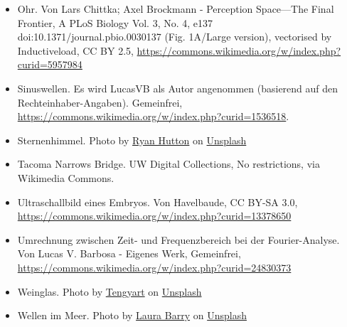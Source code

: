 \documentclass{beamer}
\begin{document}
\begin{frame}
\begin{tiny}
\begin{itemize}
\item
Ohr. Von Lars Chittka; Axel Brockmann - Perception Space—The Final Frontier, A PLoS Biology Vol. 3, No. 4, e137 doi:10.1371/journal.pbio.0030137 (Fig. 1A/Large version), vectorised by Inductiveload, CC BY 2.5, \url{https://commons.wikimedia.org/w/index.php?curid=5957984}

\item
Sinuswellen. Es wird LucasVB als Autor angenommen (basierend auf den Rechteinhaber-Angaben). Gemeinfrei, \url{https://commons.wikimedia.org/w/index.php?curid=1536518}.  

\item
Sternenhimmel. Photo by \href{https://unsplash.com/@ryan_hutton_?utm_source=unsplash&utm_medium=referral&utm_content=creditCopyText}{Ryan Hutton} on \href{https://unsplash.com/s/photos/stars?utm_source=unsplash&utm_medium=referral&utm_content=creditCopyText}{Unsplash}

\item
Tacoma Narrows Bridge. UW Digital Collections, No restrictions, via Wikimedia Commons.

\item
Ultraschallbild eines Embryos. Von Havelbaude, CC BY-SA 3.0, \url{https://commons.wikimedia.org/w/index.php?curid=13378650}

\item
Umrechnung zwischen Zeit- und Frequenzbereich bei der Fourier-Analyse. Von Lucas V. Barbosa - Eigenes Werk, Gemeinfrei, \url{https://commons.wikimedia.org/w/index.php?curid=24830373}

\item
Weinglas. Photo by \href{https://unsplash.com/@tengyart?utm_source=unsplash&utm_medium=referral&utm_content=creditCopyText}{Tengyart} on \href{https://unsplash.com/s/photos/empty-wine-glass?utm_source=unsplash&utm_medium=referral&utm_content=creditCopyText}{Unsplash}
  

\item
Wellen im Meer. Photo by \href{https://unsplash.com/@lauraashtonashley?utm_source=unsplash&utm_medium=referral&utm_content=creditCopyText}{Laura Barry} on \href{https://unsplash.com/s/photos/waves?utm_source=unsplash&utm_medium=referral&utm_content=creditCopyText}{Unsplash}
  

\end{itemize}
\end{tiny}
\end{frame}
\end{document}
